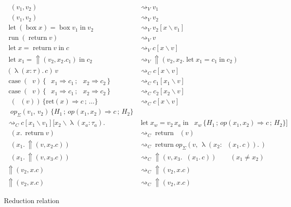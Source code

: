 \documentclass[acmsmall, screen, nonacm]{acmart}
\theoremstyle{definition}
\newcommand{\reflectname}{\Uparrow}
\newcommand{\performraw}[2]{\mathop{\reflectname(#1(#2))}}
\newcommand{\perform}[5]{\performraw{#1}{#2}(#3, #4. #5)}
\newcommand{\reifyname}{\Downarrow}
\newcommand{\reifyraw}[1]{\mathop{\reifyname_{#1}}}
\newcommand{\reify}[3]{\reifyraw{#1}(#2.\,#3)}
\newcommand{\outl}[1]{\mathop{\mathrm{out}_L} #1}
\newcommand{\outr}[1]{\mathop{\mathrm{out}_R} #1}
\newcommand{\indintro}[4]{#2_{#1}(#3,\, #4)}
\newcommand{\retname}{\mathrm{ret}}
\newcommand{\ret}[2]{\mathop{\retname_{#1}}(#2)}
\newcommand{\indelim}[3]{\mathop{\mathrm{rec}_{#1}} #2 \,\{#3\}}
\newcommand{\indretcase}[2]{\retname(#1) \Rightarrow #2}
\newcommand{\indcase}[4]{#1(#2, #3) \Rightarrow #4}
\newcommand{\seq}{\,;\,}
\newcommand{\fst}{\mathop{\pi_1}}
\newcommand{\snd}{\mathop{\pi_2}}
\newcommand{\inl}[1]{\mathop{\mathrm{in}_L} #1}
\newcommand{\inr}[1]{\mathop{\mathrm{in}_R} #1}
\newcommand{\case}[5]{\mathop{\mathrm{case}} #1 \,\{\,\inl{#2} \Rightarrow #3 \seq \inr{#4} \Rightarrow #5 \,\}}
\newcommand{\abs}[3]{\mathop{\lambda}(#1 \types #2).\,#3}
\newcommand{\app}[2]{#1\,#2}
\newcommand{\types}{\mathrel{:}}
\newcommand{\return}[1]{\mathop{\mathrm{return}} #1}
\newcommand{\letv}[3]{\mathop{\mathrm{let}} #1 = #2 \mathop{\mathrm{in}} #3}
\newcommand{\gbox}[1]{\mathop{\mathrm{box}} #1}
\newcommand{\gunbox}[3]{\mathop{\mathrm{let}} (\gbox #1) = #2 \mathop{\mathrm{in}} #3}
\newcommand{\grun}[1]{\mathop{\mathrm{run}}(#1)}
\newcommand{\sbst}[3]{#1[#2\backslash#3]}
\newcommand{\reducestov}{\rightsquigarrow_V}
\newcommand{\reducestoc}{\rightsquigarrow_C}
\begin{document}
\begin{figure}
\begin{align*}
\fst{(v_1, v_2)} &\reducestov v_1 \\
\snd{(v_1, v_2)} &\reducestov v_2 \\
\gunbox{x}{\gbox{v_1}}{v_2} &\reducestov \sbst{v_2}{x}{v_1} \\
\grun{\return{v}} &\reducestov v \\
\letv{x}{\return{v}}{c} &\reducestov \sbst{c}{x}{v} \\
\letv{x_1}{\perform{v_1}{op}{v_2}{x_2}{c_1}}{c_2} &\reducestov \perform{v_1}{op}{v_2}{x_2}{\letv{x_1}{c_1}{c_2}} \\
\app{(\abs{x}{\tau}{c})}{v} &\reducestoc \sbst{c}{x}{v} \\
\case{(\inl{v})}{x_1}{c_1}{x_2}{c_2} &\reducestoc \sbst{c_1}{x_1}{v} \\
\case{(\inr{v})}{x_1}{c_1}{x_2}{c_2} &\reducestoc \sbst{c_2}{x_2}{v} \\
\indelim{\Sigma}{(\ret{\Sigma}{v})}{\indretcase{x}{c} \seq \ldots} &\reducestoc \sbst{c}{x}{v} \\
\indelim{\Sigma}{\indintro{\Sigma}{op}{v_1}{v_2}}{H_1 \seq \indcase{op}{x_1}{x_2}{c} \seq H_2} \\
  \reducestoc \sbst{\sbst{c}{x_1}{v_1}}{x_2}{\abs{x_a}{\tau_a}{&\letv{x_w}{\app{v_2}{x_a}}{\indelim{\Sigma}{x_w}{H_1 \seq \indcase{op}{x_1}{x_2}{c} \seq H_2}}}} \\
\reify{\Sigma}{x}{\return{v}} &\reducestoc \return{\ret{\Sigma}{v}} \\
\reify{\Sigma}{x_1}{\perform{x_1}{op}{v}{x_2}{c}} &\reducestoc \return{\indintro{\Sigma}{op}{v}{\abs{x_2}{\reify{\Sigma}{x_1}{c}}}} \\
\reify{\Sigma}{x_1}{\perform{x_2}{op}{v}{x_3}{c}} &\reducestoc \perform{x_2}{op}{v}{x_3}{\reify{\Sigma}{x_1}{c}} \qquad (x_1 \neq x_2) \\
\perform{(\outl{v_1})}{op}{v_2}{x}{c} &\reducestoc \perform{v_1}{\mathrm{left}(op)}{v_2}{x}{c} \\
\perform{(\outr{v_1})}{op}{v_2}{x}{c} &\reducestoc \perform{v_1}{\mathrm{right}(op)}{v_2}{x}{c}
\end{align*}
\caption{Reduction relation}
\label{fig:reduction}
\end{figure}
\end{document}
